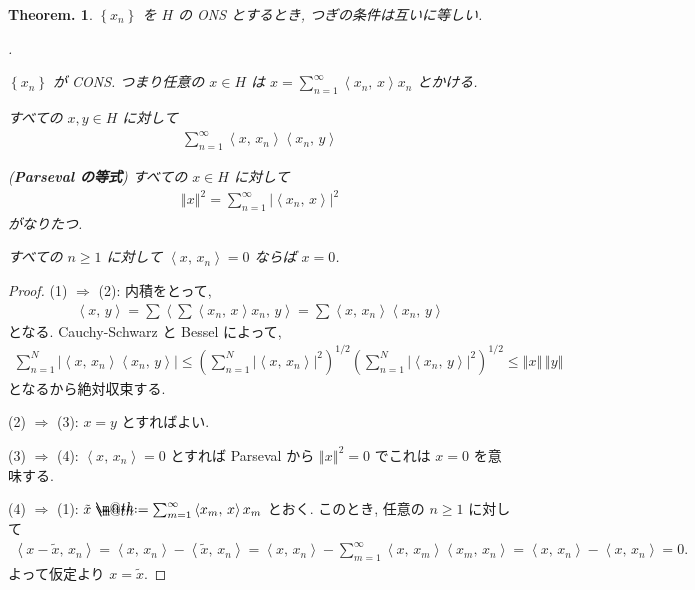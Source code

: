 \documentclass[openany, a4paper, oneside]{jsbook}
\makeatletter
\newcounter{enum2}
\renewenvironment{enumerate}{%
\begin{list}%
{%
\arabic{enum2}.\ \,%
}%
{%
\usecounter{enum2}
\setlength{\itemindent}{0pt}%
\setlength{\leftmargin}{15pt}%
\setlength{\rightmargin}{0pt}%
\setlength{\labelsep}{0pt}%
\setlength{\labelwidth}{6pt}%
\setlength{\itemsep}{0pt}%
\setlength{\parsep}{0pt}%
\setlength{\listparindent}{0pt}%
}
}{%
\end{list}%
}
\newcommand*{\defeq}{\mathrel{\rlap{%
\raisebox{0.3ex}{$\m@th\cdot$}}%
\raisebox{-0.3ex}{$\m@th\cdot$}}%
=}
\theoremstyle{break}
\theoremstyle{breakdefn}
\newtheorem{thm}{Theorem.}[section]
\newcommand{\abs}[1]{\left|#1\right|}
\newcommand{\norm}[1]{\left\Vert#1\right\Vert}
\newcommand{\rbk}[1]{\left (#1\right)}
\newcommand{\cbk}[1]{\left\{#1\right\}}
\newcommand{\bkt}[2]{\left\langle#1,\,#2\right\rangle}
\newcommand{\upbf}[1]{\textup{\textbf{#1}}}
\makeatother
\begin{document}
\begin{thm}\label{functional_analysis_hilbert_space_yukimi_8}
 $\cbk{x_n}$ を $H$ の ONS とするとき, つぎの条件は互いに等しい.
\begin{enumerate}
\item $\cbk{x_n}$ が CONS.
    つまり任意の $x \in H$ は $x = \sum_{n=1}^\infty \bkt{x_n}{x} x_n$ とかける.
\item すべての $x, y \in H$ に対して
   \begin{align}
    \sum_{n=1}^\infty \bkt{x}{x_n} \bkt{x_n}{y} \label{functional_analysis_hilbert_space_yukimi_9}
   \end{align}
\item (\upbf{Parseval の等式}) すべての $x \in H$ に対して
   \begin{align}
    \norm{x}^2
    =
    \sum_{n = 1}^\infty \abs{\bkt{x_n}{x}}^2
   \end{align}
    がなりたつ.
\item すべての $n \geq 1$ に対して $\bkt{x}{x_n} = 0$ ならば $x = 0$.
\end{enumerate}
\end{thm}
\begin{proof}
(1) $\Rightarrow$ (2):
内積をとって,
\begin{align}
 \bkt{x}{y}
 =
 \sum \bkt{\sum \bkt{x_n}{x} x_n}{y}
 =
 \sum \bkt{x}{x_n} \bkt{x_n}{y}
\end{align}
となる.
Cauchy-Schwarz と Bessel によって,
\begin{align}
 \sum_{n=1}^N \abs{\bkt{x}{x_n} \bkt{x_n}{y}}
 \leq
 \rbk{\sum_{n=1}^N \abs{\bkt{x}{x_n}}^2}^{1/2}
  \rbk{\sum_{n=1}^N \abs{\bkt{x_n}{y}}^2}^{1/2}
 \leq
 \norm{x} \, \norm{y}
\end{align}
となるから絶対収束する.

(2) $\Rightarrow$ (3):
$x = y$ とすればよい.

(3) $\Rightarrow$ (4):
$\bkt{x}{x_n} = 0$ とすれば Parseval から $\norm{x}^2 = 0$ でこれは $x = 0$ を意味する.

(4) $\Rightarrow$ (1):
$\tilde{x} \defeq \sum_{m = 1}^\infty \bkt{x_m}{x} x_m$ とおく.
このとき, 任意の $n \geq 1$ に対して
\begin{align}
 \bkt{x - \tilde{x}}{x_n}
 =
 \bkt{x}{x_n} - \bkt{\tilde{x}}{x_n}
 =
 \bkt{x}{x_n} - \sum_{m=1}^{\infty} \bkt{x}{x_m} \bkt{x_m}{x_n}
 =
 \bkt{x}{x_n} - \bkt{x}{x_n}
 = 0.
\end{align}
よって仮定より $x = \tilde{x}$.
\end{proof}
\end{document}
